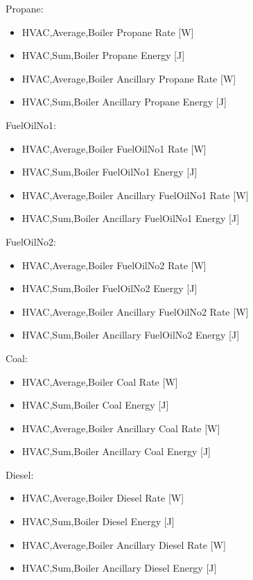 Propane:

\begin{itemize}
    \item
    HVAC,Average,Boiler Propane Rate {[}W{]}
    \item
    HVAC,Sum,Boiler Propane Energy {[}J{]}
    \item
    HVAC,Average,Boiler Ancillary Propane Rate {[}W{]}
    \item
    HVAC,Sum,Boiler Ancillary Propane Energy {[}J{]}
\end{itemize}

FuelOilNo1:

\begin{itemize}
    \item
    HVAC,Average,Boiler FuelOilNo1 Rate {[}W{]}
    \item
    HVAC,Sum,Boiler FuelOilNo1 Energy {[}J{]}
    \item
    HVAC,Average,Boiler Ancillary FuelOilNo1 Rate {[}W{]}
    \item
    HVAC,Sum,Boiler Ancillary FuelOilNo1 Energy {[}J{]}
\end{itemize}

FuelOilNo2:

\begin{itemize}
    \item
    HVAC,Average,Boiler FuelOilNo2 Rate {[}W{]}
    \item
    HVAC,Sum,Boiler FuelOilNo2 Energy {[}J{]}
    \item
    HVAC,Average,Boiler Ancillary FuelOilNo2 Rate {[}W{]}
    \item
    HVAC,Sum,Boiler Ancillary FuelOilNo2 Energy {[}J{]}
\end{itemize}

Coal:

\begin{itemize}
    \item
    HVAC,Average,Boiler Coal Rate {[}W{]}
    \item
    HVAC,Sum,Boiler Coal Energy {[}J{]}
    \item
    HVAC,Average,Boiler Ancillary Coal Rate {[}W{]}
    \item
    HVAC,Sum,Boiler Ancillary Coal Energy {[}J{]}
\end{itemize}

Diesel:

\begin{itemize}
    \item
    HVAC,Average,Boiler Diesel Rate {[}W{]}
    \item
    HVAC,Sum,Boiler Diesel Energy {[}J{]}
    \item
    HVAC,Average,Boiler Ancillary Diesel Rate {[}W{]}
    \item
    HVAC,Sum,Boiler Ancillary Diesel Energy {[}J{]}
\end{itemize}

